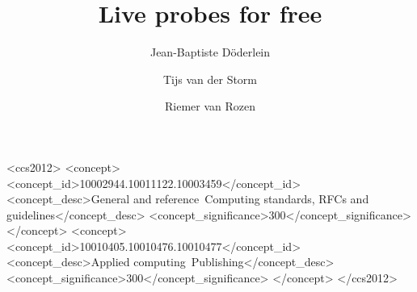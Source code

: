 \documentclass[english,submission]{programming}
\begin{document}
\title{Live probes for free}

\author[a]{Jean-Baptiste Döderlein}
\author[b]{Tijs van der Storm}
\author[b]{Riemer van Rozen}




\begin{CCSXML}
<ccs2012>
<concept>
<concept_id>10002944.10011122.10003459</concept_id>
<concept_desc>General and reference~Computing standards, RFCs and guidelines</concept_desc>
<concept_significance>300</concept_significance>
</concept>
<concept>
<concept_id>10010405.10010476.10010477</concept_id>
<concept_desc>Applied computing~Publishing</concept_desc>
<concept_significance>300</concept_significance>
</concept>
</ccs2012>
\end{CCSXML}



\maketitle
\end{document}
